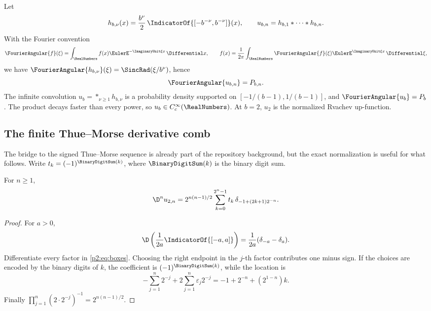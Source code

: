\documentclass[11pt,oneside]{article}
\numberwithin{equation}{section}
\theoremstyle{definition}
\theoremstyle{remark}
\begin{document}
Let
\begin{equation}
 h_{b,\nu}(x)=\frac{b^\nu}{2}\,\IndicatorOf{[-b^{-\nu},b^{-\nu}]}(x),
 \qquad
 u_{b,n}=h_{b,1}*\cdots*h_{b,n}.
 \label{p2:eq:boxes}
\end{equation}
With the Fourier convention
\[
 \FourierAngular{f}(\xi)=\int_{\RealNumbers}f(x)\EulerE^{-\ImaginaryUnit\xi x}\,\Differential x,
 \qquad
 f(x)=\frac1{2\pi}\int_{\RealNumbers}\FourierAngular{f}(\xi)\EulerE^{\ImaginaryUnit\xi x}\,\Differential\xi,
\]
we have \(\FourierAngular{h_{b,\nu}}(\xi)=\SincRad(\xi/b^\nu)\), hence
\begin{equation}
\FourierAngular{u_{b,n}}=P_{b,n}.
 \label{p2:eq:finiteFT}
\end{equation}
The infinite convolution \(u_b=*_{\nu\geq1}h_{b,\nu}\) is a probability density
supported on \([-1/(b-1),1/(b-1)]\), and \(\FourierAngular{u_b}=P_b\). The product
decays faster than every power, so \(u_b\in C_c^\infty(\RealNumbers)\). At \(b=2\),
\(u_2\) is the normalized Rvachev up-function.

\subsection{The finite Thue--Morse derivative comb}

The bridge to the signed Thue--Morse sequence is already part of the repository
background, but the exact normalization is useful for what follows. Write
\(t_k=(-1)^{\BinaryDigitSum(k)}\), where \(\BinaryDigitSum(k)\) is the binary digit sum.

\begin{proposition}
For \(n\geq1\),
\begin{equation}
 \D^n u_{2,n}
 =2^{n(n-1)/2}\sum_{k=0}^{2^n-1}t_k\,
 \delta_{-1+(2k+1)2^{-n}}.
 \label{p2:eq:TMcomb}
\end{equation}
\end{proposition}

\begin{proof}
For \(a>0\),
\[
 \D\left(\frac1{2a}\IndicatorOf{[-a,a]}\right)
 =\frac1{2a}(\delta_{-a}-\delta_a).
\]
Differentiate every factor in \eqref{p2:eq:boxes}. Choosing the right endpoint in
the \(j\)-th factor contributes one minus sign. If the choices are encoded by
the binary digits of \(k\), the coefficient is \((-1)^{\BinaryDigitSum(k)}\), while the
location is
\[
 -\sum_{j=1}^n2^{-j}+2\sum_{j=1}^n\varepsilon_j2^{-j}
 =-1+2^{-n}+(2^{1-n})k.
\]
Finally \(\prod_{j=1}^n(2\cdot2^{-j})^{-1}=2^{n(n-1)/2}\).
\end{proof}
\end{document}
